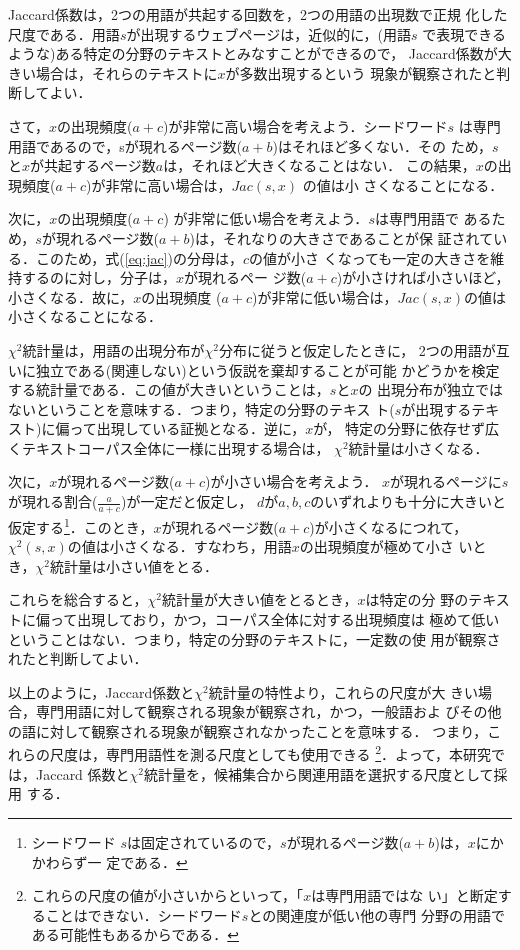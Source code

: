 Jaccard係数は，2つの用語が共起する回数を，2つの用語の出現数で正規
化した尺度である．用語$s$が出現するウェブページは，近似的に，(用語$s$ 
で表現できるような)ある特定の分野のテキストとみなすことができるので，
Jaccard係数が大きい場合は，それらのテキストに$x$が多数出現するという
現象が観察されたと判断してよい．

さて，$x$の出現頻度($a+c$)が非常に高い場合を考えよう．シードワード$s$ 
は専門用語であるので，sが現れるページ数($a+b$)はそれほど多くない．その
ため，$s$と$x$が共起するページ数$a$は，それほど大きくなることはない．
この結果，$x$の出現頻度($a+c$)が非常に高い場合は，$Jac(s,x)$ の値は小
さくなることになる．

次に，$x$の出現頻度($a+c$) が非常に低い場合を考えよう．$s$は専門用語で
あるため，$s$が現れるページ数($a+b$)は，それなりの大きさであることが保
証されている．このため，\mbox{式(\ref{eq:jac})}の分母は，$c$の値が小さ
くなっても一定の大きさを維持するのに対し，分子は，$x$が現れるペー
ジ数($a+c$)が小さければ小さいほど，小さくなる．故に，$x$の出現頻度
($a+c$)が非常に低い場合は，$Jac(s,x)$の値は小さくなることになる．

\newpage 
{}

$\chi ^2$統計量は，用語の出現分布が$\chi ^2$分布に従うと仮定したときに，
2つの用語が互いに独立である(関連しない)という仮説を棄却することが可能
かどうかを検定する統計量である．この値が大きいということは，$s$と$x$の
出現分布が独立ではないということを意味する．つまり，特定の分野のテキス
ト($s$が出現するテキスト)に偏って出現している証拠となる．逆に，$x$が，
特定の分野に依存せず広くテキストコーパス全体に一様に出現する場合は，
$\chi ^2$統計量は小さくなる．

次に，$x$が現れるページ数($a+c$)が小さい場合を考えよう．
$x$が現れるページに$s$が現れる割合($\frac{a}{a+c}$)が一定だと仮定し，
$d$が$a,b,c$のいずれよりも十分に大きいと仮定する\footnote{シードワード
$s$は固定されているので，$s$が現れるページ数($a+b$)は，$x$にかかわらず一
定である．}．このとき，$x$が現れるページ数($a+c$)が小さくなるにつれて，
$\chi ^2(s,x)$の値は小さくなる．すなわち，用語$x$の出現頻度が極めて小さ
いとき，$\chi ^2$統計量は小さい値をとる．

これらを総合すると，$\chi ^2$統計量が大きい値をとるとき，$x$は特定の分
野のテキストに偏って出現しており，かつ，コーパス全体に対する出現頻度は
極めて低いということはない．つまり，特定の分野のテキストに，一定数の使
用が観察されたと判断してよい．

\bigskip

以上のように，Jaccard係数と$\chi ^2$統計量の特性より，これらの尺度が大
きい場合，専門用語に対して観察される現象が観察され，かつ，一般語およ
びその他の語に対して観察される現象が観察されなかったことを意味する．
つまり，これらの尺度は，専門用語性を測る尺度としても使用できる
\footnote{これらの尺度の値が小さいからといって，「$x$は専門用語ではな
い」と断定することはできない．シードワード$s$との関連度が低い他の専門
分野の用語である可能性もあるからである．}．よって，本研究では，Jaccard 
係数と$\chi ^2$統計量を，候補集合から関連用語を選択する尺度として採用
する．

